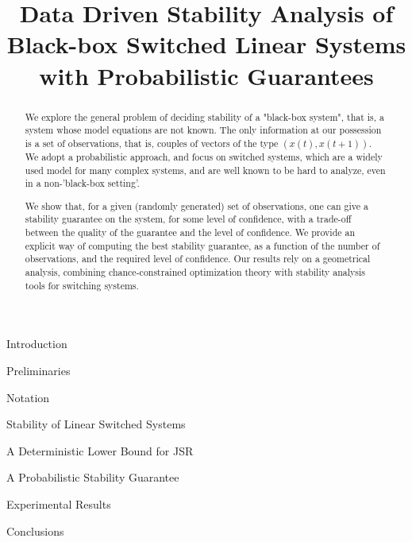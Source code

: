 \documentclass[letterpaper, 10 pt, conference]{ieeeconf}
\title{Data Driven Stability Analysis of Black-box Switched Linear Systems \\with Probabilistic Guarantees}
\begin{document}
\maketitle

\begin{abstract}
We explore the general problem of deciding stability of a "black-box system", that is, a system whose model equations are not known.  The only information at our possession is a set of observations, that is, couples of vectors of the type $(x(t), x(t+1)).$  We adopt a probabilistic approach, and focus on switched systems, which are a widely used model for many complex systems, and are well known to be hard to analyze, even in a non-'black-box setting'.  

We show that, for a given (randomly generated) set of observations, one can give a stability guarantee on the system, for some level of confidence, with a trade-off between the quality of the guarantee and the level of confidence.  We provide an explicit way of computing the best stability guarantee, as a function of the number of observations, and the required level of confidence.  Our results rely on a geometrical analysis, combining chance-constrained optimization theory with stability analysis tools for switching systems.
\end{abstract}

\begin{section}{Introduction}

\end{section}

\begin{section}{Preliminaries}
\begin{subsection}{Notation}
 
\end{subsection}
\begin{subsection}{Stability of Linear Switched Systems}

\end{subsection}
\end{section}

\begin{section}{A Deterministic Lower Bound for JSR}

\end{section}

\begin{section}{A Probabilistic Stability Guarantee}



%
%
%
\end{section}

\begin{section}{Experimental Results}

\end{section}

\begin{section}{Conclusions}

\end{section}

\appendix
\label{appendix}





\end{document}
